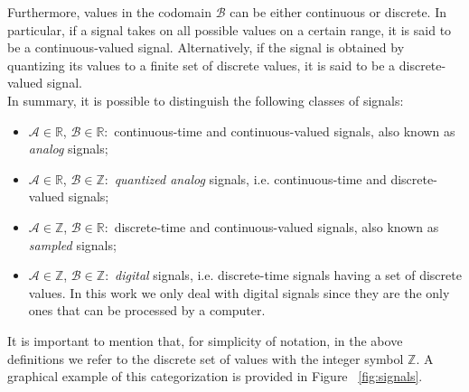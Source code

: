 Furthermore, values in the codomain $\mathcal{B}$ can be either continuous or discrete. In particular, if a signal takes on all possible values on a certain range, it is said to be a continuous-valued signal. Alternatively, if the signal is obtained by quantizing its values to a finite set of discrete values, it is said to be a discrete-valued signal. \\ 
In summary, it is possible to distinguish the following classes of signals:
\begin{itemize}
	\item $\mathcal{A}\in\mathbb{R}$, $\mathcal{B}\in\mathbb{R}:$ continuous-time and continuous-valued signals, also known as \textit{analog} signals;
	\item $\mathcal{A}\in\mathbb{R}$, $\mathcal{B}\in\mathbb{Z}:$ \textit{quantized analog} signals, i.e. continuous-time and discrete-valued signals;
	\item $\mathcal{A}\in\mathbb{Z}$, $\mathcal{B}\in\mathbb{R}:$ discrete-time and continuous-valued signals, also known as \textit{sampled} signals;
	\item $\mathcal{A}\in\mathbb{Z}$, $\mathcal{B}\in\mathbb{Z}:$ \textit{digital} signals, i.e. discrete-time signals having a set of discrete values. In this work we only deal with digital signals since they are the only ones that can be processed by a computer.
\end{itemize}
It is important to mention that, for simplicity of notation, in the above definitions we refer to the discrete set of values with the integer symbol $\mathbb{Z}$. A graphical example of this categorization is provided in Figure ~\ref{fig:signals}.

